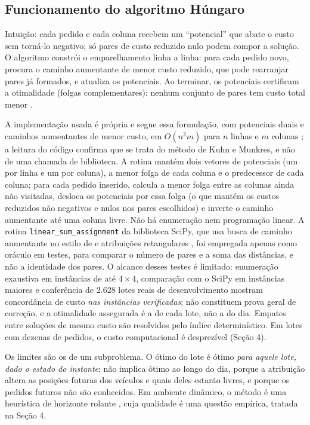\subsection{Funcionamento do algoritmo Húngaro}

Intuição: cada pedido e cada coluna recebem um \enquote{potencial} que abate o custo sem torná-lo negativo; só pares de custo reduzido nulo podem compor a solução. O algoritmo constrói o emparelhamento linha a linha: para cada pedido novo, procura o caminho aumentante de menor custo reduzido, que pode rearranjar pares já formados, e atualiza os potenciais. Ao terminar, os potenciais certificam a otimalidade (folgas complementares): nenhum conjunto de pares tem custo total menor \cite{kuhn1955, munkres1957}.

A implementação usada é própria e segue essa formulação, com potenciais duais e caminhos aumentantes de menor custo, em $O(n^2 m)$ para $n$ linhas e $m$ colunas \cite{tomizawa1971, edmondskarp1972}; a leitura do código confirma que se trata do método de Kuhn e Munkres, e não de uma chamada de biblioteca. A rotina mantém dois vetores de potenciais (um por linha e um por coluna), a menor folga de cada coluna e o predecessor de cada coluna; para cada pedido inserido, calcula a menor folga entre as colunas ainda não visitadas, desloca os potenciais por essa folga (o que mantém os custos reduzidos não negativos e nulos nos pares escolhidos) e inverte o caminho aumentante até uma coluna livre. Não há enumeração nem programação linear. A rotina \texttt{linear\_sum\_assignment} da biblioteca SciPy, que usa busca de caminho aumentante no estilo de  e atribuições retangulares \cite{crouse2016}, foi empregada apenas como oráculo em testes, para comparar o número de pares e a soma das distâncias, e não a identidade dos pares. O alcance desses testes é limitado: enumeração exaustiva em instâncias de até $4\times4$, comparação com o SciPy em instâncias maiores e conferência de 2.628 lotes reais de desenvolvimento mostram concordância de custo \emph{nas instâncias verificadas}; não constituem prova geral de correção, e a otimalidade assegurada é a de cada lote, não a do dia. Empates entre soluções de mesmo custo são resolvidos pelo índice determinístico. Em lotes com dezenas de pedidos, o custo computacional é desprezível (Seção 4).

Os limites são os de um subproblema. O ótimo do lote é ótimo \emph{para aquele lote, dado o estado do instante}; não implica ótimo ao longo do dia, porque a atribuição altera as posições futuras dos veículos e quais deles estarão livres, e porque os pedidos futuros não são conhecidos. Em ambiente dinâmico, o método é uma heurística de horizonte rolante \cite{pillac2013}, cuja qualidade é uma questão empírica, tratada na Seção 4.

